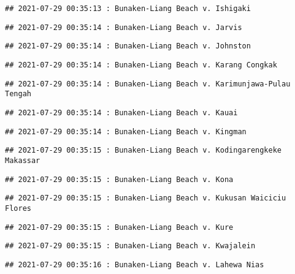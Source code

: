 \documentclass[
]{article}
\begin{document}
\begin{verbatim}
## 2021-07-29 00:35:13 : Bunaken-Liang Beach v. Ishigaki
\end{verbatim}

\begin{verbatim}
## 2021-07-29 00:35:14 : Bunaken-Liang Beach v. Jarvis
\end{verbatim}

\begin{verbatim}
## 2021-07-29 00:35:14 : Bunaken-Liang Beach v. Johnston
\end{verbatim}

\begin{verbatim}
## 2021-07-29 00:35:14 : Bunaken-Liang Beach v. Karang Congkak
\end{verbatim}

\begin{verbatim}
## 2021-07-29 00:35:14 : Bunaken-Liang Beach v. Karimunjawa-Pulau Tengah
\end{verbatim}

\begin{verbatim}
## 2021-07-29 00:35:14 : Bunaken-Liang Beach v. Kauai
\end{verbatim}

\begin{verbatim}
## 2021-07-29 00:35:14 : Bunaken-Liang Beach v. Kingman
\end{verbatim}

\begin{verbatim}
## 2021-07-29 00:35:15 : Bunaken-Liang Beach v. Kodingarengkeke Makassar
\end{verbatim}

\begin{verbatim}
## 2021-07-29 00:35:15 : Bunaken-Liang Beach v. Kona
\end{verbatim}

\begin{verbatim}
## 2021-07-29 00:35:15 : Bunaken-Liang Beach v. Kukusan Waiciciu Flores
\end{verbatim}

\begin{verbatim}
## 2021-07-29 00:35:15 : Bunaken-Liang Beach v. Kure
\end{verbatim}

\begin{verbatim}
## 2021-07-29 00:35:15 : Bunaken-Liang Beach v. Kwajalein
\end{verbatim}

\begin{verbatim}
## 2021-07-29 00:35:16 : Bunaken-Liang Beach v. Lahewa Nias
\end{verbatim}
\end{document}

